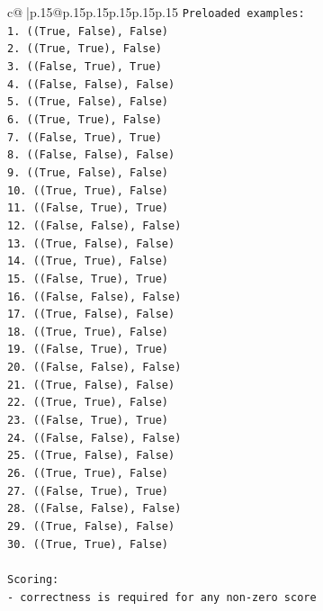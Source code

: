 \documentclass{article}
\begin{document}
{\begin{supertabular}{c@{$\;$}|p{.15\linewidth}@{}p{.15\linewidth}p{.15\linewidth}p{.15\linewidth}p{.15\linewidth}p{.15\linewidth}}
{{{\texttt{Preloaded examples:} \\
\texttt{1. ((True, False), False)} \\
\texttt{2. ((True, True), False)} \\
\texttt{3. ((False, True), True)} \\
\texttt{4. ((False, False), False)} \\
\texttt{5. ((True, False), False)} \\
\texttt{6. ((True, True), False)} \\
\texttt{7. ((False, True), True)} \\
\texttt{8. ((False, False), False)} \\
\texttt{9. ((True, False), False)} \\
\texttt{10. ((True, True), False)} \\
\texttt{11. ((False, True), True)} \\
\texttt{12. ((False, False), False)} \\
\texttt{13. ((True, False), False)} \\
\texttt{14. ((True, True), False)} \\
\texttt{15. ((False, True), True)} \\
\texttt{16. ((False, False), False)} \\
\texttt{17. ((True, False), False)} \\
\texttt{18. ((True, True), False)} \\
\texttt{19. ((False, True), True)} \\
\texttt{20. ((False, False), False)} \\
\texttt{21. ((True, False), False)} \\
\texttt{22. ((True, True), False)} \\
\texttt{23. ((False, True), True)} \\
\texttt{24. ((False, False), False)} \\
\texttt{25. ((True, False), False)} \\
\texttt{26. ((True, True), False)} \\
\texttt{27. ((False, True), True)} \\
\texttt{28. ((False, False), False)} \\
\texttt{29. ((True, False), False)} \\
\texttt{30. ((True, True), False)} \\
\\ 
\texttt{Scoring:} \\
\texttt{{-} correctness is required for any non{-}zero score} \\
}}}
\end{supertabular}}
\end{document}
